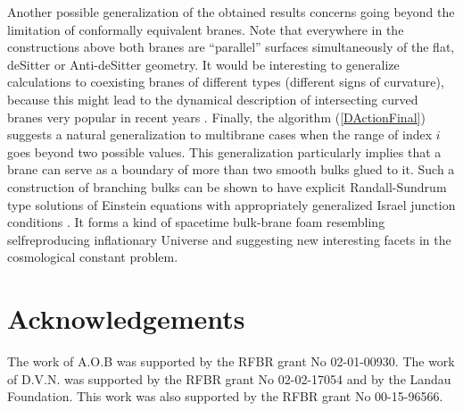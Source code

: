 \documentclass[a4paper,12pt]{article}
\begin{document}
Another possible generalization of the obtained results concerns
going beyond the limitation of conformally equivalent branes. Note
that everywhere in the constructions above both branes are
``parallel'' surfaces simultaneously of the flat, deSitter or
Anti-deSitter geometry. It would be interesting to generalize
calculations to coexisting branes of different types (different
signs of curvature), because this might lead to the dynamical
description of intersecting curved branes very popular in recent
years \cite{Reall,KOST,Pyr,Neronov,Bucher}. Finally, the algorithm
(\ref{DActionFinal}) suggests a natural generalization to
multibrane cases when the range of index $i$ goes beyond two
possible values. This generalization particularly implies that a
brane can serve as a boundary of more than two smooth bulks glued
to it. Such a construction of branching bulks can be shown to have
explicit Randall-Sundrum type solutions of Einstein equations with
appropriately generalized Israel junction conditions
\cite{Nesterov}. It forms a kind of spacetime bulk-brane foam
resembling selfreproducing inflationary Universe \cite{Linde} and
suggesting new interesting facets in the cosmological constant
problem.


\section*{Acknowledgements}
\hspace{\parindent}The work of A.O.B was supported by the RFBR
grant No 02-01-00930. The work of D.V.N. was supported by the RFBR
grant No 02-02-17054 and by the Landau Foundation. This work was
also supported by the RFBR grant No 00-15-96566.
\end{document}
